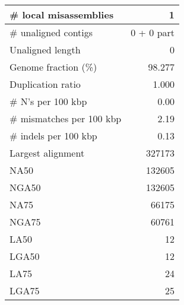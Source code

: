 \documentclass[12pt,a4paper]{article}
\begin{document}
\begin{table}[ht]
\begin{center}
\begin{tabular}{|l*{1}{|r}|}
\# local misassemblies & 1 \\ \hline
\# unaligned contigs & 0 + 0 part \\ \hline
Unaligned length & 0 \\ \hline
Genome fraction (\%) & 98.277 \\ \hline
Duplication ratio & 1.000 \\ \hline
\# N's per 100 kbp & 0.00 \\ \hline
\# mismatches per 100 kbp & 2.19 \\ \hline
\# indels per 100 kbp & 0.13 \\ \hline
Largest alignment & 327173 \\ \hline
NA50 & 132605 \\ \hline
NGA50 & 132605 \\ \hline
NA75 & 66175 \\ \hline
NGA75 & 60761 \\ \hline
LA50 & 12 \\ \hline
LGA50 & 12 \\ \hline
LA75 & 24 \\ \hline
LGA75 & 25 \\ \hline
\end{tabular}
\end{center}
\end{table}
\end{document}
